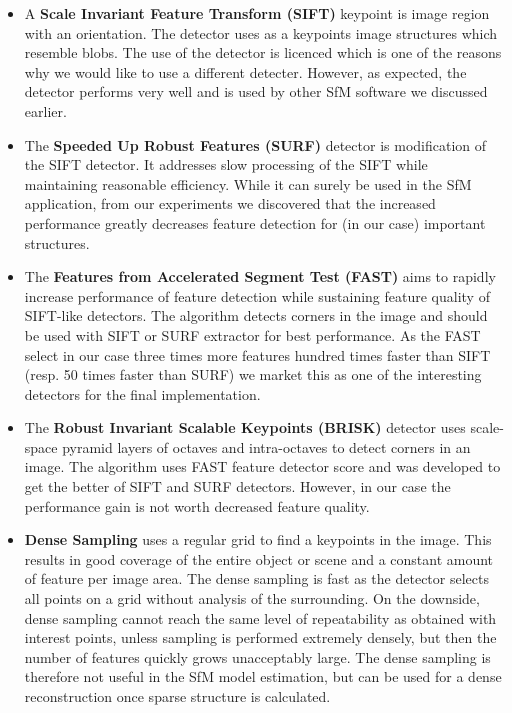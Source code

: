 \begin{itemize}
	\item A \textbf{Scale Invariant Feature Transform (SIFT)} keypoint is image region with an orientation. The detector uses as a keypoints image structures  which resemble blobs. The use of the detector is licenced which is one of the reasons why we would like to use a different detecter. However, as expected, the detector performs very well and is used by other SfM software we discussed earlier. \cite{article:sift}
	
	\item The \textbf{Speeded Up Robust Features (SURF)} detector is modification of the SIFT detector. It addresses slow processing of the SIFT while maintaining reasonable efficiency. While it can surely be used in the SfM application, from our experiments we discovered that the increased performance greatly decreases feature detection for (in our case) important structures.  \cite{www:surf}
	
	\item The \textbf{Features from Accelerated Segment Test (FAST)} aims to rapidly increase performance of feature detection while sustaining feature quality of SIFT-like detectors. The algorithm detects corners in the image and should be used with SIFT or SURF extractor for best performance. As the FAST select in our case three times more features hundred times faster than SIFT (resp. 50 times faster than SURF) we market this as one of the interesting detectors for the final implementation. \cite{article:fast}
	
	
	\item The \textbf{Robust Invariant Scalable Keypoints (BRISK)} detector uses scale-space pyramid layers of octaves and intra-octaves to detect corners in an image. The algorithm uses FAST feature detector score and was developed to get the better of SIFT and SURF detectors. However, in our case the performance gain is not worth decreased feature quality. \cite{article:brisk}
	
	\item \textbf{Dense Sampling} uses a regular grid to find a keypoints in the image. This results in good coverage of the entire object or scene and a constant amount of feature per image area. The dense sampling is fast as the detector selects all points on a grid without analysis of the surrounding. On the downside, dense sampling cannot reach the same level of repeatability as obtained with interest points, unless sampling is performed extremely densely, but then the number of features quickly grows unacceptably large. The dense sampling is therefore not useful in the SfM model estimation, but can be used for a dense reconstruction once sparse structure is calculated. \cite{article:dense}
	

\end{itemize}
